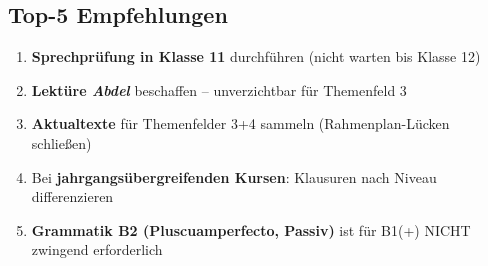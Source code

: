 \documentclass[10pt,a4paper]{article}
\begin{document}
\subsection{Top-5 Empfehlungen}

\begin{enumerate}
\item \textbf{Sprechprüfung in Klasse 11} durchführen (nicht warten bis Klasse 12)
\item \textbf{Lektüre \textit{Abdel}} beschaffen -- unverzichtbar für Themenfeld 3
\item \textbf{Aktualtexte} für Themenfelder 3+4 sammeln (Rahmenplan-Lücken schließen)
\item Bei \textbf{jahrgangsübergreifenden Kursen}: Klausuren nach Niveau differenzieren
\item \textbf{Grammatik B2 (Pluscuamperfecto, Passiv)} ist für B1(+) NICHT zwingend erforderlich
\end{enumerate}

\vfill

\begin{center}
\end{center}
\end{document}
